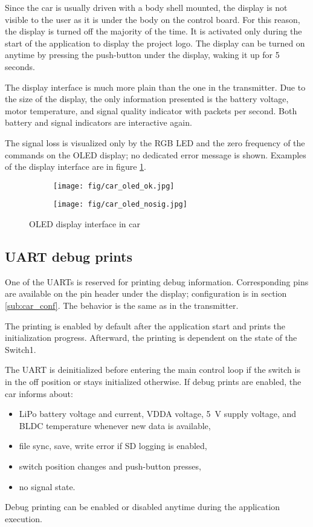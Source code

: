 Since the car is usually driven with a body shell mounted, the display is not visible to the user as it is under the body on the control board. For this reason, the display is turned off the majority of the time. It is activated only during the start of the application to display the project logo. The display can be turned on anytime by pressing the push-button under the display, waking it up for 5 seconds.

The display interface is much more plain than the one in the transmitter. 
Due to the size of the display, the only information presented is the battery voltage, motor temperature, and signal quality indicator with packets per second. Both battery and signal indicators are interactive again.

The signal loss is visualized only by the RGB LED and the zero frequency of the commands on the OLED display; no dedicated error message is shown. Examples of the display interface are in figure \ref{fig:car_oled}.
\begin{figure}[h]
    \centering
    \begin{subfigure}{0.4\textwidth}
    \centering
        \texttt{[image: fig/car\_oled\_ok.jpg]}
    \end{subfigure}%
    \hspace{1cm}
    \begin{subfigure}{0.4\textwidth}
    \centering
		\texttt{[image: fig/car\_oled\_nosig.jpg]}
    \end{subfigure}
	\caption{OLED display interface in car}
    \label{fig:car_oled}
\end{figure}

\subsection{UART debug prints}
One of the UARTs is reserved for printing debug information. Corresponding pins are available on the pin header under the display; configuration is in section \ref{sub:car_conf}. The behavior is the same as in the transmitter.

The printing is enabled by default after the application start and prints the initialization progress. Afterward, the printing is dependent on the state of the Switch1.

The UART is deinitialized before entering the main control loop if the switch is in the off position or stays initialized otherwise. If debug prints are enabled, the car informs about:
\begin{itemize}
\item LiPo battery voltage and current, VDDA voltage, \SI{5}{\V} supply voltage, and BLDC temperature whenever new data is available,
\item file sync, save, write error if SD logging is enabled,
\item switch position changes and push-button presses,
\item no signal state.
\end{itemize}
Debug printing can be enabled or disabled anytime during the application execution.